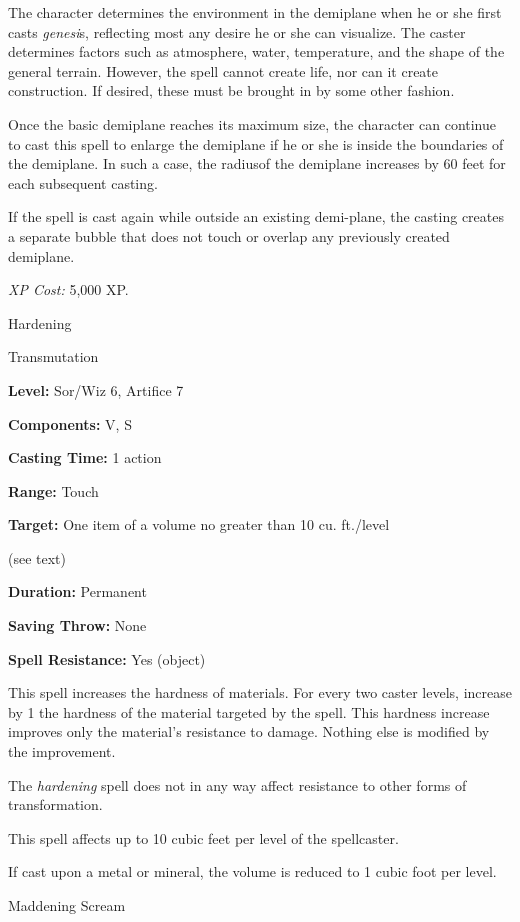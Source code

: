 \documentclass{article}
\begin{document}
The character determines the environment in the demiplane when he or she first 
casts \textit{genesi}s, reflecting most any desire he or she can visualize. The 
caster determines factors such as atmosphere, water, temperature, and the shape 
of the general terrain. However, the spell cannot create life, nor can it create 
construction. If desired, these must be brought in by some other fashion.

Once the basic demiplane reaches its maximum size, the character can continue to 
cast this spell to enlarge the demiplane if he or she is inside the boundaries 
of the demiplane. In such a case, the radiusof the demiplane increases by 60 feet 
for each subsequent casting.

If the spell is cast again while outside an existing demi-plane, the casting creates 
a separate bubble that does not touch or overlap any previously created demiplane.

\textit{XP Cost: }5,000 XP.

\vspace{12pt}
Hardening

Transmutation

\textbf{Level:} Sor/Wiz 6, Artifice 7

\textbf{Components:} V, S

\textbf{Casting Time:} 1 action

\textbf{Range:} Touch

\textbf{Target:} One item of a volume no greater than 10 cu. ft./level

(see text)

\textbf{Duration:} Permanent

\textbf{Saving Throw:} None

\textbf{Spell Resistance:} Yes (object)

This spell increases the hardness of materials.  For every two caster levels, increase 
by 1 the hardness of the material targeted by the spell. This hardness increase 
improves only the material's resistance to damage. Nothing else is modified by 
the improvement.

The \textit{hardening }spell does not in any way affect resistance to other forms 
of transformation. 

This spell affects up to 10 cubic feet per level of the spellcaster.

If cast upon a metal or mineral, the volume is reduced to 1 cubic foot per level.

\vspace{12pt}
Maddening Scream
\end{document}
